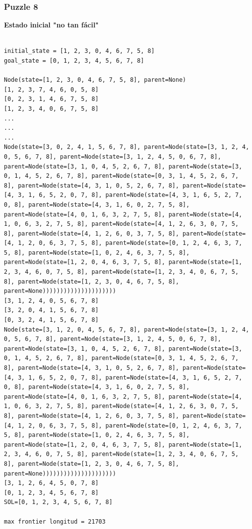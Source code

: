 \documentclass[xcolor=table]{beamer}
\begin{document}
\begin{frame} [fragile ]\frametitle{Puzzle 8} \footnotesize
\textbf{Estado inicial "no tan fácil"}
\begin{verbatim}

initial_state = [1, 2, 3, 0, 4, 6, 7, 5, 8]
goal_state = [0, 1, 2, 3, 4, 5, 6, 7, 8]

Node(state=[1, 2, 3, 0, 4, 6, 7, 5, 8], parent=None)
[1, 2, 3, 7, 4, 6, 0, 5, 8]
[0, 2, 3, 1, 4, 6, 7, 5, 8]
[1, 2, 3, 4, 0, 6, 7, 5, 8]
...
...
...
Node(state=[3, 0, 2, 4, 1, 5, 6, 7, 8], parent=Node(state=[3, 1, 2, 4, 0, 5, 6, 7, 8], parent=Node(state=[3, 1, 2, 4, 5, 0, 6, 7, 8], parent=Node(state=[3, 1, 0, 4, 5, 2, 6, 7, 8], parent=Node(state=[3, 0, 1, 4, 5, 2, 6, 7, 8], parent=Node(state=[0, 3, 1, 4, 5, 2, 6, 7, 8], parent=Node(state=[4, 3, 1, 0, 5, 2, 6, 7, 8], parent=Node(state=[4, 3, 1, 6, 5, 2, 0, 7, 8], parent=Node(state=[4, 3, 1, 6, 5, 2, 7, 0, 8], parent=Node(state=[4, 3, 1, 6, 0, 2, 7, 5, 8], parent=Node(state=[4, 0, 1, 6, 3, 2, 7, 5, 8], parent=Node(state=[4, 1, 0, 6, 3, 2, 7, 5, 8], parent=Node(state=[4, 1, 2, 6, 3, 0, 7, 5, 8], parent=Node(state=[4, 1, 2, 6, 0, 3, 7, 5, 8], parent=Node(state=[4, 1, 2, 0, 6, 3, 7, 5, 8], parent=Node(state=[0, 1, 2, 4, 6, 3, 7, 5, 8], parent=Node(state=[1, 0, 2, 4, 6, 3, 7, 5, 8], parent=Node(state=[1, 2, 0, 4, 6, 3, 7, 5, 8], parent=Node(state=[1, 2, 3, 4, 6, 0, 7, 5, 8], parent=Node(state=[1, 2, 3, 4, 0, 6, 7, 5, 8], parent=Node(state=[1, 2, 3, 0, 4, 6, 7, 5, 8], parent=None)))))))))))))))))))))
[3, 1, 2, 4, 0, 5, 6, 7, 8]
[3, 2, 0, 4, 1, 5, 6, 7, 8]
[0, 3, 2, 4, 1, 5, 6, 7, 8]
Node(state=[3, 1, 2, 0, 4, 5, 6, 7, 8], parent=Node(state=[3, 1, 2, 4, 0, 5, 6, 7, 8], parent=Node(state=[3, 1, 2, 4, 5, 0, 6, 7, 8], parent=Node(state=[3, 1, 0, 4, 5, 2, 6, 7, 8], parent=Node(state=[3, 0, 1, 4, 5, 2, 6, 7, 8], parent=Node(state=[0, 3, 1, 4, 5, 2, 6, 7, 8], parent=Node(state=[4, 3, 1, 0, 5, 2, 6, 7, 8], parent=Node(state=[4, 3, 1, 6, 5, 2, 0, 7, 8], parent=Node(state=[4, 3, 1, 6, 5, 2, 7, 0, 8], parent=Node(state=[4, 3, 1, 6, 0, 2, 7, 5, 8], parent=Node(state=[4, 0, 1, 6, 3, 2, 7, 5, 8], parent=Node(state=[4, 1, 0, 6, 3, 2, 7, 5, 8], parent=Node(state=[4, 1, 2, 6, 3, 0, 7, 5, 8], parent=Node(state=[4, 1, 2, 6, 0, 3, 7, 5, 8], parent=Node(state=[4, 1, 2, 0, 6, 3, 7, 5, 8], parent=Node(state=[0, 1, 2, 4, 6, 3, 7, 5, 8], parent=Node(state=[1, 0, 2, 4, 6, 3, 7, 5, 8], parent=Node(state=[1, 2, 0, 4, 6, 3, 7, 5, 8], parent=Node(state=[1, 2, 3, 4, 6, 0, 7, 5, 8], parent=Node(state=[1, 2, 3, 4, 0, 6, 7, 5, 8], parent=Node(state=[1, 2, 3, 0, 4, 6, 7, 5, 8], parent=None)))))))))))))))))))))
[3, 1, 2, 6, 4, 5, 0, 7, 8]
[0, 1, 2, 3, 4, 5, 6, 7, 8]
SOL=[0, 1, 2, 3, 4, 5, 6, 7, 8]

max frontier longitud = 21703
\end{verbatim}

\end{frame} 
\end{document}
